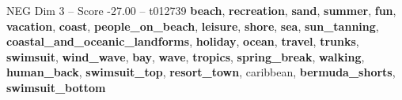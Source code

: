 \begin{textsample}{NEG Dim 3 – Score -27.00 – t012739}  \label{ex:f3_neg_010}
\textbf{beach}, \textbf{recreation}, \textbf{sand}, \textbf{summer}, \textbf{fun}, \textbf{vacation}, \textbf{coast}, \textbf{people\_on\_beach}, \textbf{leisure}, \textbf{shore}, \textbf{sea}, \textbf{sun\_tanning}, \textbf{coastal\_and\_oceanic\_landforms}, \textbf{holiday}, \textbf{ocean}, \textbf{travel}, \textbf{trunks}, \textbf{swimsuit}, \textbf{wind\_wave}, \textbf{bay}, \textbf{wave}, \textbf{tropics}, \textbf{spring\_break}, \textbf{walking}, \textbf{human\_back}, \textbf{swimsuit\_top}, \textbf{resort\_town}, caribbean, \textbf{bermuda\_shorts}, \textbf{swimsuit\_bottom}

\end{textsample}
